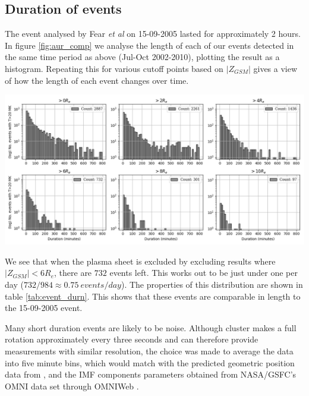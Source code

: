 \documentclass[12pt]{article}
\newenvironment{Figure}
  {\par\medskip\noindent\minipage{\linewidth}}
  {\endminipage\par\medskip}
\begin{document}
\subsection{Duration of events \label{ssec:DURn}}
The event analysed by Fear \textit{et al} \cite{Fear1506} on 15-09-2005 lasted for approximately 2 hours. In figure \ref{fig:aur_comp} we analyse the length of each of our events detected in the same time period as above (Jul-Oct 2002-2010), plotting the result as a histogram. Repeating this for various cutoff points based on $|Z_{GSM}|$ gives a view of how the length of each event changes over time. 

\begin{Figure}
    \centering
    \includegraphics[width=\textwidth]{aur_comp.png}
    \label{fig:aur_comp}
\end{Figure}

We see that when the plasma sheet is excluded by excluding results where $|Z_{GSM}|<6R_e$, there are $732$ events left. This works out to be just under one per day ($732/984\approx0.75\ events/day$). The properties of this distribution are shown in table \ref{tab:event_durn}. This shows that these events are comparable in length to the 15-09-2005 event.

Many short duration events are likely to be noise. Although cluster makes a full rotation approximately every three seconds and can therefore provide measurements with similar resolution, the choice was made to average the data into five minute bins, which would match with the predicted geometric position data from \cite{cdms}, and the IMF components parameters obtained from NASA/GSFC's OMNI data set through OMNIWeb \cite{omniData}.
\end{document}
